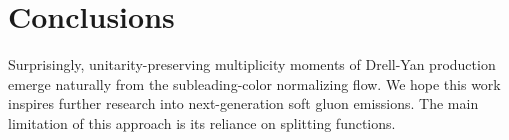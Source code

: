 \section{Conclusions}\label{sec:conclusions}

Surprisingly, unitarity-preserving multiplicity moments of Drell-Yan
production emerge naturally from the subleading-color normalizing flow.
We hope this work inspires further research into next-generation soft
gluon emissions. The main limitation of this approach is its reliance on
splitting functions.


